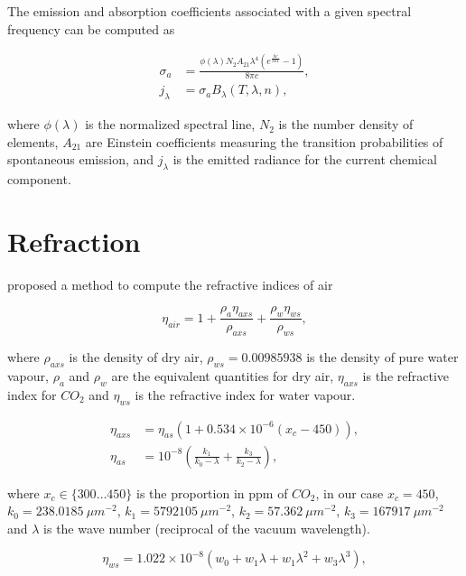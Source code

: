 The emission and absorption coefficients associated with a given spectral frequency can be computed as


\begin{align}
\sigma_a &= \frac{\phi(\lambda) N_2 A_{21} \lambda^4 (e ^\frac{h c}{\lambda k T} - 1)}{8 \pi c}, \\
j_\lambda &= \sigma_a B_\lambda (T, \lambda, n), 
\end{align}

where $\phi(\lambda)$ is the normalized spectral line, $N_2$ is the number density of elements, $A_{21}$ are Einstein coefficients measuring the transition probabilities of spontaneous emission, and $j_\lambda$ is the emitted radiance for the current chemical component.

\section{Refraction}
\label{sec:refraction}

\cite{Ciddor:1996} proposed a method to compute the refractive indices of air 

\begin{equation}
\label{eq:ciddor_eta_air}
\eta_{air} = 1 + \frac{\rho_a \eta_{axs}}{\rho_{axs}} + \frac{\rho_w \eta_{ws}}{\rho_{ws}},
\end{equation}

where $\rho_{axs}$ is the density of dry air, $\rho_{ws} = 0.00985938$ is the density of pure water vapour, $\rho_{a}$ and $\rho_{w}$ are the equivalent quantities for dry air, $\eta_{axs}$ is the refractive index for $CO_2$ and $\eta_{ws}$ is the refractive index for water vapour. 

\begin{align}
\label{eq:ciddor_eta_axs}
\eta_{axs} &= \eta_{as} \left(1 + 0.534 \times 10^{-6} \left(x_c - 450 \right) \right), \\
\label{eq:ciddor_eta_as}
\eta_{as} &= 10^{-8} \left( \frac{k_1}{k_0 - \lambda} + \frac{k_3}{k_2 - \lambda} \right),
\end{align}

where $x_c \in \lbrace 300 \ldots 450 \rbrace $ is the proportion in ppm of $CO_2$, in our case $x_c = 450$, $k_0 = 238.0185~\mu m^{-2}$, $k_1 = 5792105~\mu m^{-2}$, $k_2 = 57.362~\mu m^{-2}$, $k_3 = 167917~\mu m^{-2}$ and $\lambda$ is the wave number (reciprocal of the vacuum wavelength).

\begin{equation}
\label{eq:ciddor_eta_ws}
\eta_{ws} = 1.022 \times 10^{-8} \left( w_0 + w_1 \lambda + w_1 \lambda^2 + w_3 \lambda^3 \right),
\end{equation}

